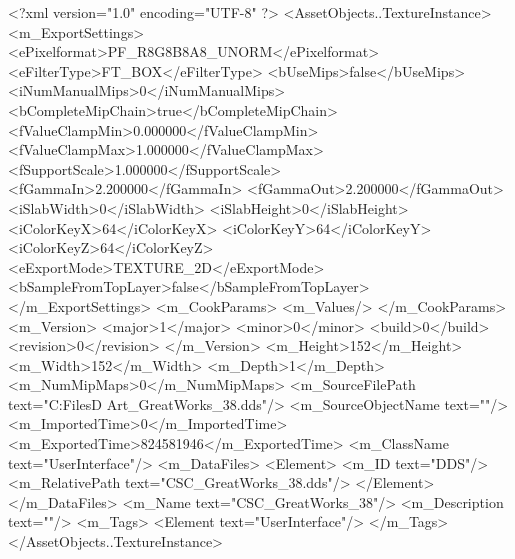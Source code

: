 <?xml version="1.0" encoding="UTF-8" ?>
<AssetObjects..TextureInstance>
	<m_ExportSettings>
		<ePixelformat>PF_R8G8B8A8_UNORM</ePixelformat>
		<eFilterType>FT_BOX</eFilterType>
		<bUseMips>false</bUseMips>
		<iNumManualMips>0</iNumManualMips>
		<bCompleteMipChain>true</bCompleteMipChain>
		<fValueClampMin>0.000000</fValueClampMin>
		<fValueClampMax>1.000000</fValueClampMax>
		<fSupportScale>1.000000</fSupportScale>
		<fGammaIn>2.200000</fGammaIn>
		<fGammaOut>2.200000</fGammaOut>
		<iSlabWidth>0</iSlabWidth>
		<iSlabHeight>0</iSlabHeight>
		<iColorKeyX>64</iColorKeyX>
		<iColorKeyY>64</iColorKeyY>
		<iColorKeyZ>64</iColorKeyZ>
		<eExportMode>TEXTURE_2D</eExportMode>
		<bSampleFromTopLayer>false</bSampleFromTopLayer>
	</m_ExportSettings>
	<m_CookParams>
		<m_Values/>
	</m_CookParams>
	<m_Version>
		<major>1</major>
		<minor>0</minor>
		<build>0</build>
		<revision>0</revision>
	</m_Version>
	<m_Height>152</m_Height>
	<m_Width>152</m_Width>
	<m_Depth>1</m_Depth>
	<m_NumMipMaps>0</m_NumMipMaps>
	<m_SourceFilePath text="C:\Users\Shadow\Desktop\Working Files\2D Art\GreatWorks\CSC_GreatWorks_38.dds"/>
	<m_SourceObjectName text=""/>
	<m_ImportedTime>0</m_ImportedTime>
	<m_ExportedTime>824581946</m_ExportedTime>
	<m_ClassName text="UserInterface"/>
	<m_DataFiles>
		<Element>
			<m_ID text="DDS"/>
			<m_RelativePath text="CSC_GreatWorks_38.dds"/>
		</Element>
	</m_DataFiles>
	<m_Name text="CSC_GreatWorks_38"/>
	<m_Description text=""/>
	<m_Tags>
		<Element text="UserInterface"/>
	</m_Tags>
</AssetObjects..TextureInstance>

